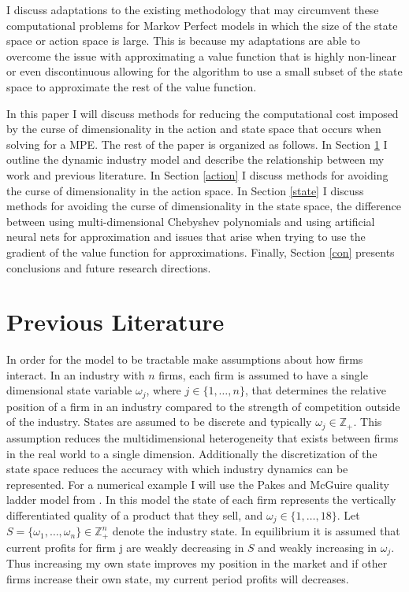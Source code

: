 \documentclass[12pt]{article}
\begin{document}
I discuss adaptations to the existing methodology that may circumvent these computational problems for Markov Perfect models in which the size of the state space or action space is large. This is because my adaptations are able to overcome the issue with approximating a value function that is highly non-linear or even discontinuous allowing for the algorithm to use a small subset of the state space to approximate the rest of the value function.

In this paper I will discuss methods for reducing the computational cost imposed by the curse of dimensionality in the action and state space that occurs when solving for a MPE. The rest of the paper is organized as follows. In Section \ref{prelit} I outline the dynamic industry model and describe the relationship between my work and previous literature. In Section \ref{action} I discuss methods for avoiding the curse of dimensionality in the action space. In Section \ref{state} I discuss methods for avoiding the curse of dimensionality in the state space, the difference between using multi-dimensional Chebyshev polynomials and using artificial neural nets for approximation and issues that arise when trying to use the gradient of the value function for approximations. Finally, Section \ref{con} presents conclusions and future research directions.

\section{Previous Literature}
\label{prelit}


In order for the model to be tractable \citet{1995_Erickson_Pakes_RES} make assumptions about how firms interact. In an industry with $n$ firms, each firm is assumed to have a single dimensional state variable $\omega_j$, where $j \in \{1, \dots, n\}$, that determines the relative position of a firm in an industry compared to the strength of competition outside of the industry. States are assumed to be discrete and typically $\omega_j \in \mathbb{Z_+}$. This assumption reduces the multidimensional heterogeneity that exists between firms in the real world to a single dimension. Additionally the discretization of the state space reduces the accuracy with which industry dynamics can be represented. For a numerical example I will use the Pakes and McGuire quality ladder model from \citet{2012_Doraszelski_Judd_QuanEcon, 1992_Pakes_McGuire_NBER}. In this model the state of each firm represents the vertically differentiated quality of a product that they sell, and $\omega_j \in \{1,\dots,18\}$. Let $S=\{\omega_1,\dots,\omega_n\} \in \mathbb{Z}_+^n$ denote the industry state. In equilibrium it is assumed that current profits for firm j are weakly decreasing in $S$ and weakly increasing in $\omega_j$. Thus increasing my own state improves my position in the market and if other firms increase their own state, my current period profits will decreases.
\end{document}
